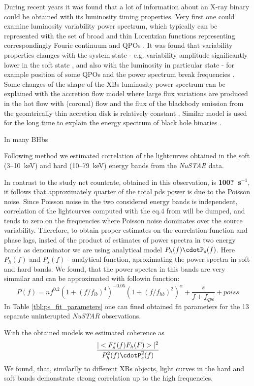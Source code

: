     During recent years it was found that a lot of information about an X-ray binary could be obtained with its luminosity timing properties.
Very first one could examine luminosity variability power spectrum, which typically can be represented with the set of broad and thin Lorentzian functions representing correspondingly Fourie continuum and QPOs \citep[see, e.g.][]{1972ApJ...174L..35T, 1990A&A...227L..33B}.
It was found that variability properties changes with the system state - e.g. variability amplitude significantly lower in the soft state \citep{},  and also with the luminosity in particular state - for example position of some QPOs and the power spectrum break frequencies \cite{1990A&A...227L..33B}. 
Some changes of the shape of the XBs luminosity power spectrum can be explained with the accretion flow model where large flux variations are produced in the hot flow with (coronal) flow and the flux of the blackbody emission from the geomtrically thin accretion disk is relatively constant \citep{churazov}. 
Similar model is used for the long time to explain the energy spectrum of black hole binaries \citep{ederly74??}.
    
    In many BHbs



Following method \citep{nowak99} we estimated correlation of the lightcurves obtained in the soft (3--10~keV) and hard (10--79~keV) energy bands from the {\it NuSTAR} data.

In contrast to the \citep{nowak99} study net countrate, obtained in this observation, is {\bf 100?~s$^{-1}$}, it follows that approximately quarter of the total pds power is due to the Poisson noise. 
Since Poisson noise in the two considered energy bands is independent, correlation of the lightcurves computed with the eq.4 from \cite{Nowak99} will be dumped, and tends to zero on the frequencies where Poisson noise dominates over the source variability.
Therefore, to obtain proper estimates on the correlation function and phase lags, insted of the product of estimates of power spectra in two energy bands as denominator we are using analytical model $P_{h}(f)\cdotP_{s}(f)$. 
Here $P_h(f)$ and $P_s(f)$ - analytical function, aproximating the power spectra in soft and hard bands.
We found, that the power spectra in this bands are very simmilar and can be approximated with followin function:
$$P(f) = n f^{0.2} (1 + (f/f_{lb})^4)^{-0.05} (1 + (f/f_{hb})^2)^{\alpha} + \frac{s}{f + f_{qpo}} + poiss$$
In Table \ref{tbl:ps_fit_parameters} one can fined obtained fit parameters for the 13 separate uninterupted {\it NuSTAR} observations.

With the obtained models we estimated coherence as 
$$\frac{|<F_s^*(f)F_h(F)>|^2}{P_{h}^2(f)\cdotP_{s}^2(f)}$$
We found, that, similarlly to different XBs objects, light curves in the hard and soft bands demonstrate strong correlation up to the high frequencies.
